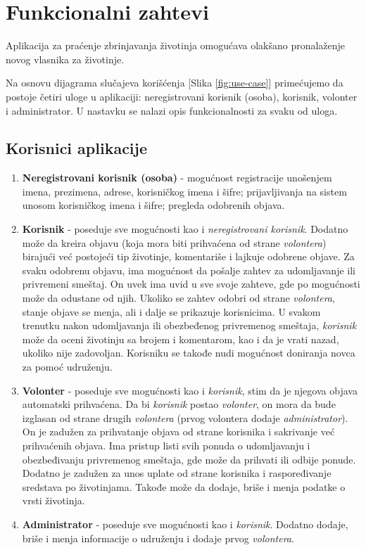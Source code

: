 \section{Funkcionalni zahtevi}
\par Aplikacija za praćenje zbrinjavanja životinja omogućava olakšano pronalaženje novog vlasnika za životinje. 
\par Na osnovu dijagrama slučajeva korišćenja [Slika \ref{fig:use-case}] primećujemo da postoje četiri uloge u aplikaciji: neregistrovani korisnik (osoba), korisnik, volonter i administrator. 
U nastavku se nalazi opis funkcionalnosti za svaku od uloga.
\subsection{Korisnici aplikacije}
\begin{enumerate}
    \item \textbf{Neregistrovani korisnik (osoba)} - mogućnost registracije unošenjem imena, prezimena, adrese, korisničkog imena i šifre;
    prijavljivanja na sistem unosom korisničkog imena i šifre; pregleda odobrenih objava.
    \item \textbf{Korisnik} - poseduje sve mogućnosti kao i \textit{neregistrovani korisnik}. Dodatno može da kreira objavu (koja mora biti prihvaćena od strane
    \textit{volontera}) birajući već postojeći tip životinje, komentariše i lajkuje odobrene objave. Za svaku odobrenu objavu, ima mogućnost da pošalje zahtev za udomljavanje ili 
    privremeni smeštaj. On uvek ima uvid u sve svoje zahteve, gde po mogućnosti može da odustane od njih. Ukoliko se zahtev odobri od strane \textit{volontera}, stanje objave se menja, 
    ali i dalje se prikazuje korisnicima. U svakom trenutku nakon udomljavanja ili obezbeđenog privremenog smeštaja, \textit{korisnik} može da oceni životinju sa brojem i komentarom, 
    kao i da je vrati nazad, ukoliko nije zadovoljan. Korisniku se takođe nudi mogućnost doniranja novca za pomoć udruženju.
    \item \textbf{Volonter} - poseduje sve mogućnosti kao i \textit{korisnik}, stim da je njegova objava automatski prihvaćena. Da bi \textit{korisnik} postao \textit{volonter}, on mora
    da bude izglasan od strane drugih \textit{volontera} (prvog volontera dodaje \textit{administrator}). On je zadužen za prihvatanje objava od strane korisnika i sakrivanje već 
    prihvaćenih objava. Ima pristup listi svih ponuda o udomljavanju i obezbeđivanju privremenog smeštaja, gde može da prihvati ili odbije ponude. Dodatno je zadužen za unos uplate od 
    strane korisnika i raspoređivanje sredstava po životinjama. Takođe može da dodaje, briše i menja podatke o vrsti životinja. 
    \item \textbf{Administrator} - poseduje sve mogućnosti kao i \textit{korisnik}. Dodatno dodaje, briše i menja informacije o udruženju i dodaje prvog \textit{volontera}.
\end{enumerate} 
